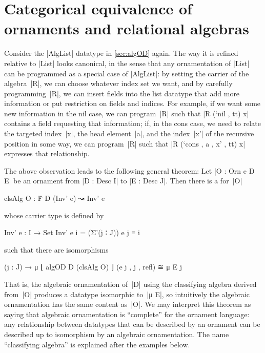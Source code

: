 \chapter{Categorical equivalence of ornaments and relational algebras}
\label{chap:equivalence}

Consider the |AlgList| datatype in \autoref{sec:algOD} again.
The way it is refined relative to |List| looks canonical, in the sense that any ornamentation of |List| can be programmed as a special case of |AlgList|:
by setting the carrier of the algebra~|R|, we can choose whatever index set we want, and by carefully programming~|R|, we can insert fields into the list datatype that add more information or put restriction on fields and indices.
For example, if we want some new information in the nil case, we can program~|R| such that |R (`nil , tt) x| contains a field requesting that information; if, in the cons case, we need to relate the targeted index~|x|, the head element~|a|, and the index~|x'| of the recursive position in some way, we can program~|R| such that |R (`cons , a , x' , tt) x| expresses that relationship.

The above observation leads to the following general theorem:
Let |O : Orn e D E| be an ornament from |D : Desc I| to |E : Desc J|.
Then there is a  for~|O|
\begin{code}
clsAlg O : Ḟ D (Inv' e) ↝ Inv' e
\end{code}
whose carrier type is defined by
\begin{code}
Inv' e : I → Set
Inv' e i = (Σ'(j ∶ J)) e j ≡ i
\end{code}
such that there are isomorphisms
\begin{code}
(j : J) → μ ⌊ algOD D (clsAlg O) ⌋ (e j , j , refl) ≅ μ E j
\end{code}
That is, the algebraic ornamentation of~|D| using the classifying algebra derived from~|O| produces a datatype isomorphic to~|μ E|, so intuitively the algebraic ornamentation has the same content as~|O|.
We may interpret this theorem as saying that algebraic ornamentation is ``complete'' for the ornament language: any relationship between datatypes that can be described by an ornament can be described up to isomorphism by an algebraic ornamentation.
The name ``classifying algebra'' is explained after the examples below.

